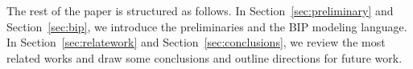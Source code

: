 





The rest of the paper is structured as follows.
%
In Section~\ref{sec:preliminary} and Section~\ref{sec:bip}, we introduce the preliminaries and the BIP modeling language.
%
In Section~\ref{sec:relatework} and Section~\ref{sec:conclusions}, we review the most related works and draw some conclusions and outline directions for future work.

